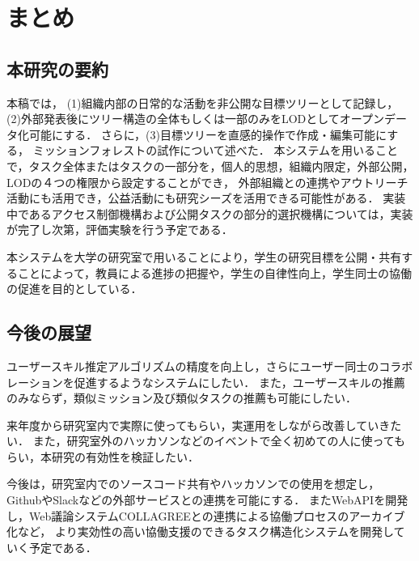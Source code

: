 \chapter{まとめ}

\section{本研究の要約}
本稿では，
(1)組織内部の日常的な活動を非公開な目標ツリーとして記録し，
(2)外部発表後にツリー構造の全体もしくは一部のみをLODとしてオープンデータ化可能にする．
さらに，(3)目標ツリーを直感的操作で作成・編集可能にする，
ミッションフォレストの試作について述べた．
本システムを用いることで，タスク全体またはタスクの一部分を，個人的思想，組織内限定，外部公開，LODの４つの権限から設定することができ，
外部組織との連携やアウトリーチ活動にも活用でき，公益活動にも研究シーズを活用できる可能性がある．
実装中であるアクセス制御機構および公開タスクの部分的選択機構については，実装が完了し次第，評価実験を行う予定である．

本システムを大学の研究室で用いることにより，学生の研究目標を公開・共有することによって，教員による進捗の把握や，学生の自律性向上，学生同士の協働の促進を目的としている．

\section{今後の展望}
ユーザースキル推定アルゴリズムの精度を向上し，さらにユーザー同士のコラボレーションを促進するようなシステムにしたい．
また，ユーザースキルの推薦のみならず，類似ミッション及び類似タスクの推薦も可能にしたい．

来年度から研究室内で実際に使ってもらい，実運用をしながら改善していきたい．
また，研究室外のハッカソンなどのイベントで全く初めての人に使ってもらい，本研究の有効性を検証したい．

今後は，研究室内でのソースコード共有やハッカソンでの使用を想定し，GithubやSlackなどの外部サービスとの連携を可能にする．
またWebAPIを開発し，Web議論システムCOLLAGREEとの連携による協働プロセスのアーカイブ化など，
より実効性の高い協働支援のできるタスク構造化システムを開発していく予定である．
